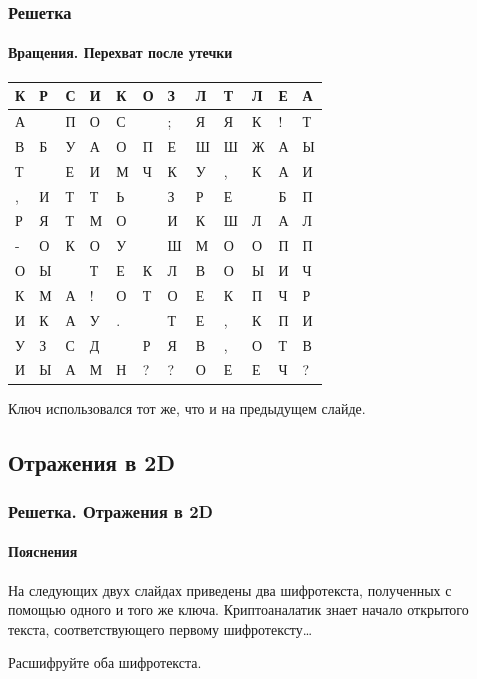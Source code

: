 \begin{frame}[fragile]
    \frametitle{Решетка}
    \framesubtitle{Вращения. Перехват после утечки}
    
    \begin{table}[ht]
        \centering
        \begin{tabular}[c]{|l@{}|l@{}|l@{}|l@{}|l@{}|l@{}|l@{}|l@{}|l@{}|l@{}|l@{}|l@{}|}
            \hline
            К&Р&С&И&К&О&З&Л&Т&Л&Е&А\\ \hline 
            А& &П&О&С& &;&Я&Я&К&!&Т\\ \hline 
            В&Б&У&А&О&П&Е&Ш&Ш&Ж&А&Ы\\ \hline 
            Т& &Е&И&М&Ч&К&У&,&К&А&И\\ \hline 
            ,&И&Т&Т&Ь& &З&Р&Е& &Б&П\\ \hline 
            Р&Я&Т&М&О& &И&К&Ш&Л&А&Л\\ \hline 
            -&О&К&О&У& &Ш&М&О&О&П&П\\ \hline 
            О&Ы& &Т&Е&К&Л&В&О&Ы&И&Ч\\ \hline 
            К&М&А&!&О&Т&О&Е&К&П&Ч&Р\\ \hline 
            И&К&А&У&.& &Т&Е&,&К&П&И\\ \hline 
            У&З&С&Д& &Р&Я&В&,&О&Т&В\\ \hline 
            И&Ы&А&М&Н&?&?&О&Е&Е&Ч&?\\ \hline 
        \end{tabular}
    \end{table}
    Ключ использовался тот же, что и на предыдущем слайде.
\end{frame}


\subsection{Отражения в 2D}


\begin{frame}[fragile]
    \frametitle{Решетка. Отражения в 2D}
    \framesubtitle{Пояснения}
        
    На следующих двух слайдах приведены два шифротекста, полученных с помощью одного и того же ключа. Криптоаналатик знает начало открытого текста, соответствующего первому шифротексту\ldots
    
    Расшифруйте оба шифротекста.
\end{frame}


